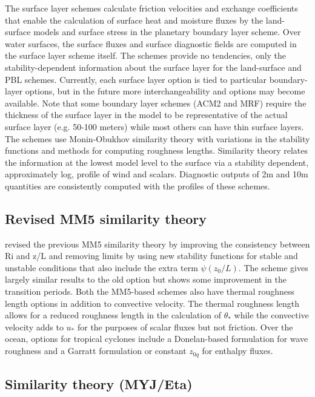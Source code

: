 The surface layer schemes calculate friction velocities and exchange 
coefficients that enable the calculation of surface heat and moisture 
fluxes by the land-surface models and surface stress in the planetary 
boundary layer scheme. Over water surfaces, the surface fluxes and surface 
diagnostic fields are computed in the surface layer scheme itself. The schemes 
provide no tendencies, only the stability-dependent information about 
the surface layer for the land-surface and PBL schemes.
Currently, each surface layer option is tied to particular boundary-layer
options, but in the future more interchangeability and options may become
available. Note that some boundary layer schemes (ACM2 and MRF) require
the thickness of the surface layer in the model to be representative of the
actual surface layer (e.g. 50-100 meters) while most others can have thin surface
layers. The schemes use Monin-Obukhov similarity theory with variations in
the stability functions and methods for computing roughness lengths.
Similarity theory relates the information at the lowest model level to the
surface via a stability dependent, approximately log, profile of wind and
scalars. Diagnostic outputs of 2m and 10m quantities are consistently
computed with the profiles of these schemes.

\subsection{Revised MM5 similarity theory}

\citet{jimenez12} revised the previous MM5 similarity theory by improving the
consistency between Ri and z/L and removing limits by using new stability
functions for stable and unstable conditions that also include the extra term
$\psi(z_0/L)$. The scheme gives largely similar results to the old option but shows
some improvement in the transition periods. Both the MM5-based schemes
also have thermal roughness length options in addition to convective velocity.
The thermal roughness length allows for a reduced roughness length in 
the calculation of $\theta_*$ while the convective velocity adds to $u_*$
for the purposes of scalar fluxes but not friction. Over the ocean, options
for tropical cyclones include a Donelan-based formulation for wave
roughness and a Garratt formulation or constant $z_{0q}$ for enthalpy fluxes.

\subsection{Similarity theory (MYJ/Eta)}

